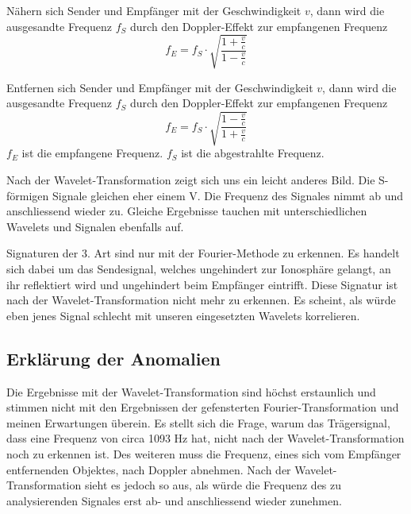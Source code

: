 \begin{refsection}
Nähern sich Sender und Empfänger mit der Geschwindigkeit $v$, dann wird die ausgesandte Frequenz $f_S$ durch den Doppler-Effekt zur empfangenen Frequenz
\[
f_E
=
f_S\cdot\sqrt{\frac{1+\frac{v}{c}}{1-\frac{v}{c}}}
\]

Entfernen sich Sender und Empfänger mit der Geschwindigkeit $v$, dann wird die ausgesandte Frequenz $f_S$ durch den Doppler-Effekt zur empfangenen Frequenz
\[
f_E
=
f_S\cdot\sqrt{\frac{1-\frac{v}{c}}{1+\frac{v}{c}}}
\]
\(f_E\) ist die empfangene Frequenz.
\(f_S\) ist die abgestrahlte Frequenz.

Nach der Wavelet-Transformation zeigt sich uns ein leicht anderes Bild.
Die S-förmigen Signale gleichen eher einem V.
Die Frequenz des Signales nimmt ab und anschliessend wieder zu.
Gleiche Ergebnisse tauchen mit unterschiedlichen Wavelets und Signalen ebenfalls auf.

Signaturen der 3. Art sind nur mit der Fourier-Methode zu erkennen.
Es handelt sich dabei um das Sendesignal, welches ungehindert zur Ionosphäre gelangt, an ihr reflektiert wird und ungehindert beim Empfänger eintrifft.
Diese Signatur ist nach der Wavelet-Transformation nicht mehr zu erkennen.
Es scheint, als würde eben jenes Signal schlecht mit unseren eingesetzten Wavelets korrelieren. 

\newpage
\subsection{Erklärung der Anomalien}
Die Ergebnisse mit der Wavelet-Transformation sind höchst erstaunlich und stimmen nicht mit den Ergebnissen der gefensterten Fourier-Transformation und meinen Erwartungen überein.
Es stellt sich die Frage, warum das Trägersignal, dass eine Frequenz von circa 1093 Hz hat, nicht nach der Wavelet-Transformation noch zu erkennen ist.
Des weiteren muss die Frequenz, eines sich vom Empfänger entfernenden Objektes, nach Doppler abnehmen.
Nach der Wavelet-Transformation sieht es jedoch so aus, als würde die Frequenz des zu analysierenden Signales erst ab- und anschliessend wieder zunehmen.


\end{refsection}
